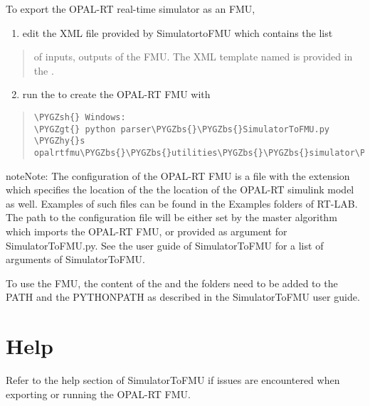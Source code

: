 \documentclass[letterpaper,10pt,english]{sphinxmanual}
\def\PYGZbs{\char`\\}
\def\PYGZus{\char`\_}
\def\PYGZgt{\char`\>}
\def\PYGZsh{\char`\#}
\def\PYGZhy{\char`\-}
\begin{document}
To export the OPAL-RT real-time simulator as an FMU,
\begin{enumerate}
\item {} 
edit the XML file provided by SimulatortoFMU which contains the list

\end{enumerate}
\begin{quote}

of inputs, outputs of the FMU. The XML template named 
is provided in the .
\end{quote}
\begin{enumerate}
\setcounter{enumi}{1}
\item {} 
run the  to create the OPAL-RT FMU with

\end{enumerate}
\begin{quote}

\begin{Verbatim}[commandchars=\\\{\}]
\PYGZsh{} Windows:
\PYGZgt{} python parser\PYGZbs{}\PYGZbs{}SimulatorToFMU.py \PYGZhy{}s opalrtfmu\PYGZbs{}\PYGZbs{}utilities\PYGZbs{}\PYGZbs{}simulator\PYGZus{}wrapper.py
\end{Verbatim}
\end{quote}

\begin{notice}{note}{Note:}
The configuration of the OPAL-RT FMU is a file with the extension  which specifies the location of the
the location of the  OPAL-RT simulink model as well. Examples of such files can be found in the Examples folders
of RT-LAB.
The path to the configuration file will be either set by the master algorithm which imports the
OPAL-RT FMU, or provided as  argument for SimulatorToFMU.py. See the user guide of SimulatorToFMU
for a list of arguments of SimulatorToFMU.

To use the FMU, the content of the  and the  folders need to be
added to the PATH and the PYTHONPATH as described in the SimulatorToFMU user guide.
\end{notice}


\chapter{Help}
\label{help::doc}\label{help:help}\label{help:id1}
Refer to the help section of SimulatorToFMU if issues are encountered when exporting or running the OPAL-RT FMU.
\end{document}
